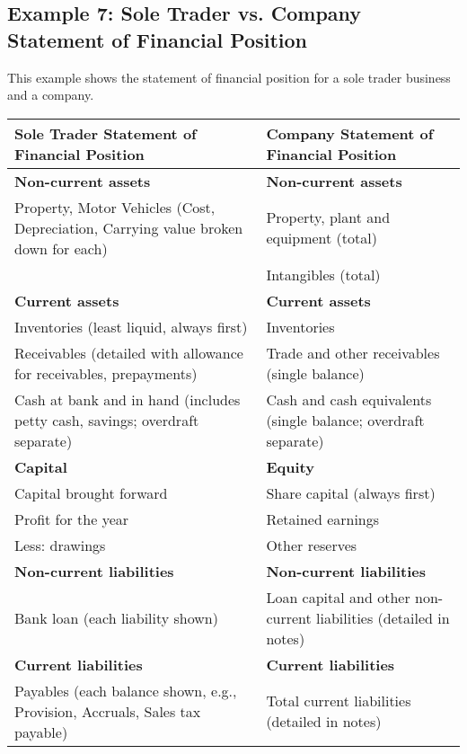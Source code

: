 \subsection*{Example 7: Sole Trader vs. Company Statement of Financial Position}
This example shows the statement of financial position for a sole trader business and a company.

\begin{tabular}{ll}
\toprule
\textbf{Sole Trader Statement of Financial Position} & \textbf{Company Statement of Financial Position} \\
\midrule
\textbf{Non-current assets} & \textbf{Non-current assets} \\
Property, Motor Vehicles (Cost, Depreciation, Carrying value broken down for each) & Property, plant and equipment (total) \\
 & Intangibles (total) \\
\midrule
\textbf{Current assets} & \textbf{Current assets} \\
Inventories (least liquid, always first) & Inventories \\
Receivables (detailed with allowance for receivables, prepayments) & Trade and other receivables (single balance) \\
Cash at bank and in hand (includes petty cash, savings; overdraft separate) & Cash and cash equivalents (single balance; overdraft separate) \\
\midrule
\textbf{Capital} & \textbf{Equity} \\
Capital brought forward & Share capital (always first) \\
Profit for the year & Retained earnings \\
Less: drawings & Other reserves \\
\midrule
\textbf{Non-current liabilities} & \textbf{Non-current liabilities} \\
Bank loan (each liability shown) & Loan capital and other non-current liabilities (detailed in notes) \\
\midrule
\textbf{Current liabilities} & \textbf{Current liabilities} \\
Payables (each balance shown, e.g., Provision, Accruals, Sales tax payable) & Total current liabilities (detailed in notes) \\
\bottomrule
\end{tabular}

